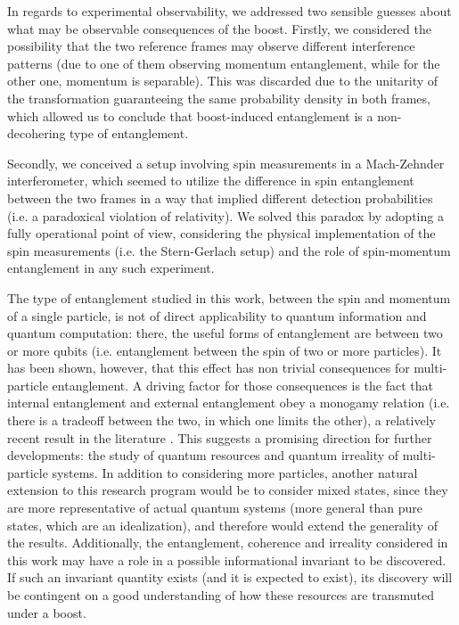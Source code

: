 \documentclass[12pt,a4paper,notitlepage]{report}
\begin{document}
In regards to experimental observability, we addressed two sensible guesses about what may be observable consequences of the boost.
Firstly, we considered the possibility that the two reference frames may observe different interference patterns (due to one of them observing momentum entanglement, while for the other one, momentum is separable). This was discarded due to the unitarity of the transformation guaranteeing the same probability density in both frames, which allowed us to conclude that boost-induced entanglement is a non-decohering type of entanglement.

Secondly, we conceived a setup involving spin measurements in a Mach-Zehnder interferometer, which seemed to utilize the difference in spin entanglement between the two frames in a way that implied different detection probabilities (i.e. a paradoxical violation of relativity). We solved this paradox by adopting a fully operational point of view, considering the physical implementation of the spin measurements (i.e. the Stern-Gerlach setup) and the role of spin-momentum entanglement in any such experiment.


The type of entanglement studied in this work, between the spin and momentum of a single particle, is not of direct applicability to quantum information and quantum computation: there, the useful forms of entanglement are between two or more qubits (i.e. entanglement between the spin of two or more particles). It has been shown, however, that this effect has non trivial consequences for multi-particle entanglement. A driving factor for those consequences is the fact that internal entanglement and external entanglement obey a monogamy relation (i.e. there is a tradeoff between the two, in which one limits the other), a relatively recent result in the literature \cite{camalet_2018, zhu_2020}. This suggests a promising direction for further developments: the study of quantum resources and quantum irreality of multi-particle systems. In addition to considering more particles, another natural extension to this research program would be to consider mixed states, since they are more representative of actual quantum systems (more general than pure states, which are an idealization), and therefore would extend the generality of the results. Additionally, the entanglement, coherence and irreality considered in this work may have a role in a possible informational invariant to be discovered. If such an invariant quantity exists (and it is expected to exist), its discovery will be contingent on a good understanding of how these resources are transmuted under a boost.
\end{document}

